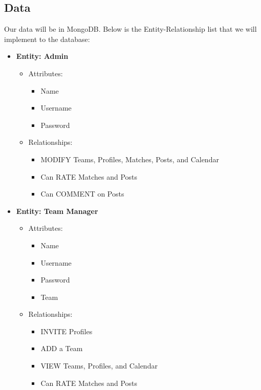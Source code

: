 \documentclass{article}
\begin{document}
\subsection{Data}
Our data will be in MongoDB. Below is the Entity-Relationship list that we will implement to the database:
\begin{itemize}
    \item \textbf{Entity: Admin}
        \begin{itemize}
            \item Attributes:
                \begin{itemize}
                    \item Name
                    \item Username
                    \item Password
                \end{itemize}
            \item Relationships:
                \begin{itemize}
                    \item MODIFY Teams, Profiles, Matches, Posts, and Calendar
                    \item Can RATE Matches and Posts
                    \item Can COMMENT on Posts
                \end{itemize}
        \end{itemize}
    \item \textbf{Entity: Team Manager}
        \begin{itemize}
            \item Attributes:
                \begin{itemize}
                    \item Name
                    \item Username
                    \item Password
                    \item Team
                \end{itemize}
            \item Relationships:
                \begin{itemize}
                    \item INVITE Profiles
                    \item ADD a Team
                    \item VIEW Teams, Profiles, and Calendar
                    \item Can RATE Matches and Posts

\end{itemize}
\end{itemize}
\end{itemize}
\end{document}
